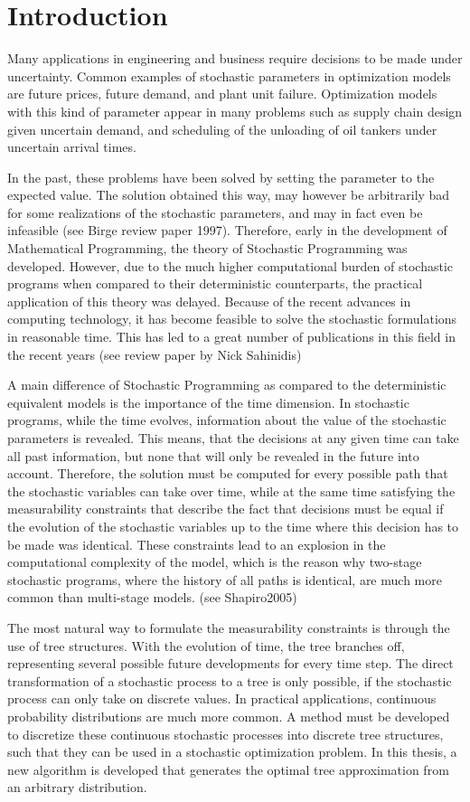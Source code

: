 \section{Introduction}
Many applications in engineering and business require decisions to be made under uncertainty. Common examples of stochastic parameters in optimization models are future prices, future demand, and plant unit failure. Optimization models with this kind of parameter appear in many problems such as supply chain design given uncertain demand, and scheduling of the unloading of oil tankers under uncertain arrival times.

In the past, these problems have been solved by setting the parameter to the expected value. The solution obtained this way, may however be arbitrarily bad for some realizations of the stochastic parameters, and may in fact even be infeasible (see Birge review paper 1997). Therefore, early in the development of Mathematical Programming, the theory of Stochastic Programming was developed. However, due to the much higher computational burden of stochastic programs when compared to their deterministic counterparts, the practical application of this theory was delayed. Because of the recent advances in computing technology, it has become feasible to solve the stochastic formulations in reasonable time. This has led to a great number of publications in this field in the recent years (see review paper by Nick Sahinidis)

A main difference of Stochastic Programming as compared to the deterministic equivalent models is the importance of the time dimension. In stochastic programs, while the time evolves, information about the value of the stochastic parameters is revealed. This means, that the decisions at any given time can take all past information, but none that will only be revealed in the future into account. Therefore, the solution must be computed for every possible path that the stochastic variables can take over time, while at the same time satisfying the measurability constraints that describe the fact that decisions must be equal if the evolution of the stochastic variables up to the time where this decision has to be made was identical. These constraints lead to an explosion in the computational complexity of the model, which is the reason why two-stage stochastic programs, where the history of all paths is identical, are much more common than multi-stage models. (see Shapiro2005)

The most natural way to formulate the measurability constraints is through the use of tree structures. With the evolution of time, the tree branches off, representing several possible future developments for every time step. The direct transformation of a stochastic process to a tree is only possible, if the stochastic process can only take on discrete values. In practical applications, continuous probability distributions are much more common. A method must be developed to discretize these continuous stochastic processes into discrete tree structures, such that they can be used in a stochastic optimization problem. In this thesis, a new algorithm is developed that generates the optimal tree approximation from an arbitrary distribution.

